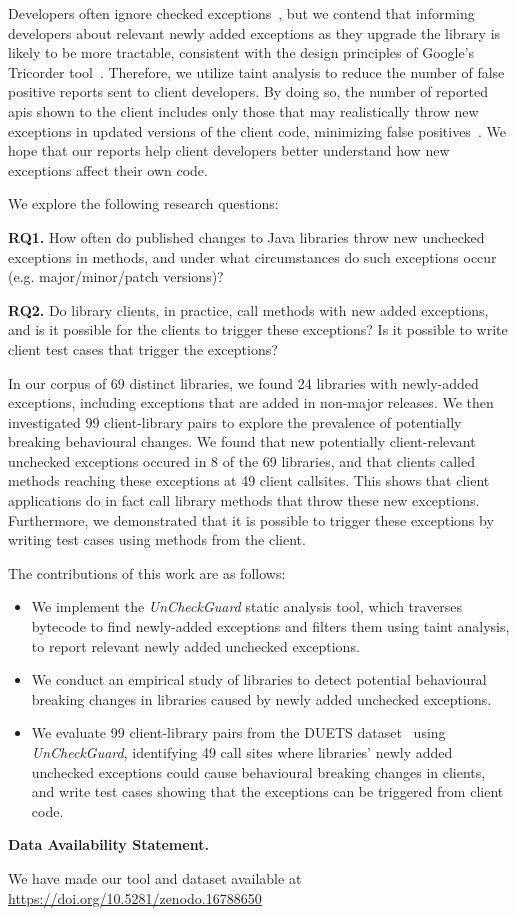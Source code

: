 Developers often ignore checked exceptions~\cite{nakshatri16:_analy_java}, but we
contend that informing developers about relevant newly added exceptions as they upgrade
the library is likely to be more tractable, consistent with the design principles
of Google’s Tricorder tool~\cite{sadowski15:_tricor}. Therefore, we utilize taint
analysis to reduce the number of false positive reports sent to client developers.
By doing so, the number of reported \gls{api}s shown to the client includes only
those that may realistically throw new exceptions in updated versions of the client
code, minimizing false positives~\cite{pashchenko20:_vuln4}.
We hope that our reports help client developers better understand how new exceptions
affect their own code.

We explore the following research questions:

\noindent
{\bf RQ1.} How often do published changes to Java libraries throw new unchecked exceptions in methods,
and under what circumstances do such exceptions occur (e.g. major/minor/patch versions)?

\noindent
{\bf RQ2.} Do library clients, in practice, call methods with new added exceptions, and is it possible for the clients to trigger these exceptions? Is it possible to write client test cases that trigger the exceptions?

In our corpus of 69 distinct libraries, we found 24 libraries with newly-added exceptions, including exceptions that are added in non-major releases.
We then investigated 99 client-library pairs to explore the prevalence of potentially breaking behavioural changes.
We found that new potentially client-relevant unchecked exceptions occured in 8 of the 69 libraries, and that clients called methods reaching these exceptions at 49 client callsites.
This shows that client applications do in fact call library methods that throw these new exceptions.
Furthermore, we demonstrated that it is possible to trigger these exceptions by writing test cases using methods from the client.

The contributions of this work are as follows:

\begin{itemize}
    \item We implement the \textit{UnCheckGuard} static analysis tool, which traverses bytecode to find newly-added exceptions and filters them using taint analysis, to report relevant newly added unchecked exceptions.
    \item We conduct an empirical study of libraries to detect potential behavioural breaking changes in libraries caused by newly added unchecked exceptions.
    \item We evaluate 99 client-library pairs from the DUETS dataset~\cite{durieux21:_duets} using \textit{UnCheckGuard}, identifying 49 call sites where libraries' newly added unchecked exceptions could cause behavioural breaking changes in clients, and write test cases showing that the exceptions can be triggered from client code.
\end{itemize}

\noindent \textbf{Data Availability Statement.}

\indent We have made our tool and dataset available at \url{https://doi.org/10.5281/zenodo.16788650}